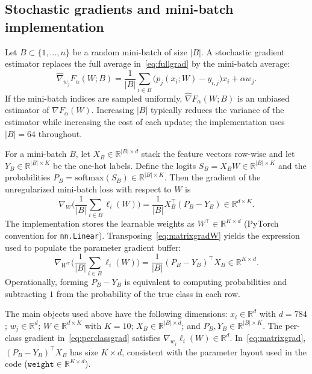 \documentclass[11pt]{article}
\numberwithin{equation}{section}
\numberwithin{table}{section}
\numberwithin{figure}{section}
\numberwithin{algorithm}{section}
\begin{document}
\subsection{Stochastic gradients and mini-batch implementation}
Let \(B\subset\{1,\dots,n\}\) be a random mini-batch of size \(|B|\). A stochastic gradient estimator replaces the full average in~\eqref{eq:fullgrad} by the mini-batch average:
\begin{equation}
\widehat{\nabla}_{w_j}F_\alpha(W;B)=\frac{1}{|B|}\sum_{i\in B}\big(p_j(x_i;W)-y_{i,j}\big)x_i+\alpha w_j.
\label{eq:stochgrad}
\end{equation}
If the mini-batch indices are sampled uniformly, \(\widehat{\nabla}F_\alpha(W;B)\) is an unbiased estimator of \(\nabla F_\alpha(W)\). Increasing \(|B|\) typically reduces the variance of the estimator while increasing the cost of each update; the implementation uses \(|B|=64\) throughout.

For a mini-batch \(B\), let \(X_B\in\mathbb{R}^{|B|\times d}\) stack the feature vectors row-wise and let \(Y_B\in\mathbb{R}^{|B|\times K}\) be the one-hot labels. Define the logits \(S_B=X_BW\in\mathbb{R}^{|B|\times K}\) and the probabilities \(P_B=\mathrm{softmax}(S_B)\in\mathbb{R}^{|B|\times K}\). Then the gradient of the unregularized mini-batch loss with respect to \(W\) is
\begin{equation}
\nabla_{W}\Big(\frac{1}{|B|}\sum_{i\in B}\ell_i(W)\Big)=\frac{1}{|B|}X_B^\top(P_B-Y_B)\in\mathbb{R}^{d\times K}.
\label{eq:matrixgradW}
\end{equation}
The implementation stores the learnable weights as \(W^\top\in\mathbb{R}^{K\times d}\) (PyTorch convention for \texttt{nn.Linear}). Transposing~\eqref{eq:matrixgradW} yields the expression used to populate the parameter gradient buffer:
\begin{equation}
\nabla_{W^\top}\Big(\frac{1}{|B|}\sum_{i\in B}\ell_i(W)\Big)=\frac{1}{|B|}(P_B-Y_B)^\top X_B\in\mathbb{R}^{K\times d}.
\label{eq:matrixgrad}
\end{equation}
Operationally, forming \(P_B-Y_B\) is equivalent to computing probabilities and subtracting \(1\) from the probability of the true class in each row.

The main objects used above have the following dimensions: \(x_i\in\mathbb{R}^{d}\) with \(d=784\); \(w_j\in\mathbb{R}^{d}\); \(W\in\mathbb{R}^{d\times K}\) with \(K=10\); \(X_B\in\mathbb{R}^{|B|\times d}\); and \(P_B,Y_B\in\mathbb{R}^{|B|\times K}\). The per-class gradient in~\eqref{eq:perclassgrad} satisfies \(\nabla_{w_j}\ell_i(W)\in\mathbb{R}^{d}\). In~\eqref{eq:matrixgrad}, \((P_B-Y_B)^\top X_B\) has size \(K\times d\), consistent with the parameter layout used in the code (\(\texttt{weight}\in\mathbb{R}^{K\times d}\)).
\end{document}

